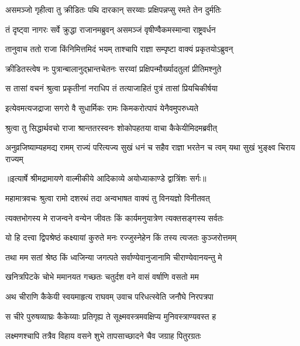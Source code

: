 \twolineshloka
{असमञ्जो गृहीत्वा तु क्रीडितः पथि दारकान्}
{सरय्वाः प्रक्षिपन्नप्सु रमते तेन दुर्मतिः} %

\twolineshloka
{तं दृष्ट्वा नागरः सर्वे क्रुद्धा राजानमब्रुवन्}
{असमञ्जं वृषीण्वैकमस्मान्वा राष्ट्रवर्धन} %

\twolineshloka
{तानुवाच ततो राजा किंनिमित्तमिदं भयम्}
{ताश्चापि राज्ञा सम्पृष्टा वाक्यं प्रकृतयोऽब्रुवन्} %

\twolineshloka
{क्रीडितस्त्वेष नः पुत्रान्बालानुद्भ्रान्तचेतनः}
{सरय्वां प्रक्षिपन्मौर्ख्यादतुलां प्रीतिमश्नुते} %

\twolineshloka
{स तासां वचनं श्रुत्वा प्रकृतीनां नराधिप}
{तं तत्याजाहितं पुत्रं तासां प्रियचिकीर्षया} %

\twolineshloka
{इत्येवमत्यजद्राजा सगरो वै सुधार्मिकः}
{रामः किमकरोत्पापं येनैवमुपरुध्यते} %

\twolineshloka
{श्रुत्वा तु सिद्धार्थवचो राजा श्रान्ततरस्वनः}
{शोकोपहतया वाचा कैकेयीमिदमब्रवीत्} %

\fourlineindentedshloka
{अनुव्रजिष्याम्यहमद्य रामम्}
{राज्यं परित्यज्य सुखं धनं च}
{सहैव राज्ञा भरतेन च त्वम्}
{यथा सुखं भुङ्क्ष्व चिराय राज्यम्} %


{॥इत्यार्षे श्रीमद्रामायणे वाल्मीकीये आदिकाव्ये अयोध्याकाण्डे द्वात्रिंशः सर्गः॥}


\twolineshloka
{महामात्रवचः श्रुत्वा रामो दशरथं तदा}
{अन्वभाषत वाक्यं तु विनयज्ञो विनीतवत्} %

\twolineshloka
{त्यक्तभोगस्य मे राजन्वने वन्येन जीवतः}
{किं कार्यमनुयात्रेण त्यक्तसङ्गस्य सर्वतः} %

\twolineshloka
{यो हि दत्त्वा द्विपश्रेष्ठं कक्ष्यायां कुरुते मनः}
{रज्जुस्नेहेन किं तस्य त्यजतः कुञ्जरोत्तमम्} %

\twolineshloka
{तथा मम सतां श्रेष्ठ किं ध्वजिन्या जगत्पते}
{सर्वाण्येवानुजानामि चीराण्येवानयन्तु मे} %

\twolineshloka
{खनित्रपिटके चोभे ममानयत गच्छतः}
{चतुर्दश वने वासं वर्षाणि वसतो मम} %

\twolineshloka
{अथ चीराणि कैकेयी स्वयमाहृत्य राघवम्}
{उवाच परिधत्स्वेति जनौघे निरपत्रपा} %

\twolineshloka
{स चीरे पुरुषव्याघ्रः कैकेय्याः प्रतिगृह्य ते}
{सूक्ष्मवस्त्रमवक्षिप्य मुनिवस्त्राण्यवस्त ह} %

\twolineshloka
{लक्ष्मणश्चापि तत्रैव विहाय वसने शुभे}
{तापसाच्छादने चैव जग्राह पितुरग्रतः} %

